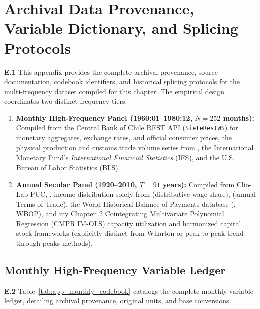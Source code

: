 \section{Archival Data Provenance, Variable Dictionary, and Splicing Protocols}
\label{app:archival_codebook}

\textbf{E.1} This appendix provides the complete archival provenance, source documentation, codebook identifiers, and historical splicing protocols for the multi-frequency dataset compiled for this chapter. The empirical design coordinates two distinct frequency tiers:
\begin{enumerate}[leftmargin=2em]
	\item \textbf{Monthly High-Frequency Panel (1960:01--1980:12, $N=252$ months):} Compiled from the Central Bank of Chile REST API (\texttt{SieteRestWS}) for monetary aggregates, exchange rates, and official consumer prices, the physical production and customs trade volume series from \citet{DiazBahamonde2023}, the International Monetary Fund's \textit{International Financial Statistics} (IFS), and the U.S. Bureau of Labor Statistics (BLS).
	\item \textbf{Annual Secular Panel (1920--2010, $T=91$ years):} Compiled from Clio-Lab PUC, \citet{Braun2000}, income distribution solely from \citet{Astorga2023} (distributive wage share), \citet{DiazLudersWagner2016} (annual Terms of Trade), the World Historical Balance of Payments database (\citealt{NievasPiketty2025}, WBOP), and my Chapter~2 Cointegrating Multivariate Polynomial Regression (CMPR IM-OLS) capacity utilization and harmonized capital stock frameworks (explicitly distinct from Wharton or peak-to-peak trend-through-peaks methods).
\end{enumerate}

\subsection{Monthly High-Frequency Variable Ledger}
\label{app:monthly_ledger}

\textbf{E.2} Table~\ref{tab:app_monthly_codebook} catalogs the complete monthly variable ledger, detailing archival provenance, original units, and base conversions.

